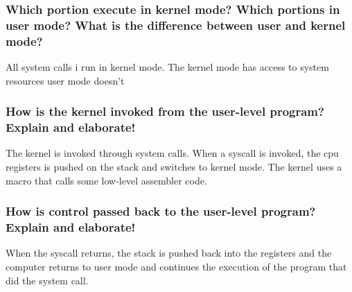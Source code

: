 
\subsubsection*{Which portion execute in kernel mode? Which portions in user mode? What is the difference between user and kernel mode?}
All system calls i run in kernel mode. The kernel mode has access to system resources user mode doesn't

\subsubsection*{How is the kernel invoked from the user-level program? Explain and elaborate!}
The kernel is invoked through system calls. When a syscall is invoked, the cpu registers is pushed on the stack and switches to kernel mode. The kernel uses a macro that calls some low-level assembler code.

\subsubsection*{How is control passed back to the user-level program? Explain and elaborate!}

When the syscall returns, the stack is pushed back into the registers and the computer returns to user mode and continues the execution of the
program that did the system call.